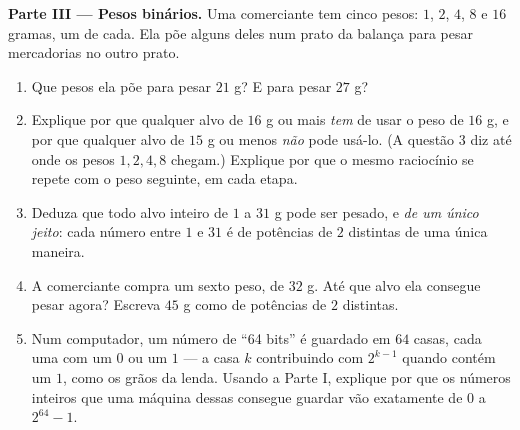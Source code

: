 \begin{problem}[{Problema de fim de semana --- a \omterm{def:g1:addition:def}{soma} geométrica
$1 + 2 + 4 + \dots + 2^{n-1} = 2^n - 1$, de uma lenda famosa aos
números binários}]
\medskip
\noindent\textbf{Parte III --- Pesos binários.}
Uma comerciante tem cinco pesos: $1$, $2$, $4$, $8$ e $16$ gramas, um
de cada. Ela põe alguns deles num prato da balança para pesar
mercadorias no outro prato.
\begin{enumerate}[resume]
  \item Que pesos ela põe para pesar $21$ g? E para pesar $27$ g?
  \item Explique por que qualquer alvo de $16$ g ou mais \emph{tem}
        de usar o peso de $16$ g, e por que qualquer alvo de $15$ g ou
        menos \emph{não} pode usá-lo. (A questão 3 diz até onde os
        pesos $1, 2, 4, 8$ chegam.) Explique por que o mesmo raciocínio
        se repete com o peso seguinte, em cada etapa.
  \item Deduza que todo alvo inteiro de $1$ a $31$ g pode ser pesado, e
        \emph{de um único jeito}: cada número entre $1$ e $31$ é 
        de potências de $2$ distintas de uma única maneira.
  \item A comerciante compra um sexto peso, de $32$ g. Até que alvo ela
        consegue pesar agora? Escreva $45$ g como  de potências de
        $2$ distintas.
  \item Num computador, um número de ``64 bits'' é guardado em $64$
        casas, cada uma com um $0$ ou um $1$ --- a casa $k$
        contribuindo com $2^{k-1}$ quando contém um $1$, como os grãos
        da lenda. Usando a Parte I, explique por que os números
        inteiros que uma máquina dessas consegue guardar vão exatamente
        de $0$ a $2^{64} - 1$.
\end{enumerate}
\end{problem}
